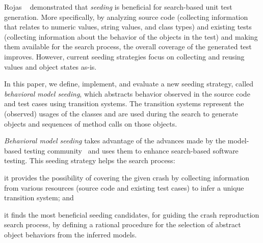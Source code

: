 
Rojas \etal~\cite{Rojas2016} demonstrated that \emph{seeding} is beneficial for search-based unit test generation. More specifically, by analyzing source code (collecting information that relates to numeric values, string values, and class types) and existing tests (collecting information about the behavior of the objects in the test) and making them available for the search process, the overall coverage of the generated test improves. 
However, current seeding strategies focus on collecting and reusing values and object states as-is. 

In this paper, we define, implement, and evaluate a new seeding strategy, called \emph{behavioral model seeding}, which abstracts behavior observed in the source code and test cases using transition systems. The transition systems represent the (observed) usages of the classes and are used during the search to generate objects and sequences of method calls on those objects.

\emph{Behavioral model seeding} takes advantage of the advances made by the model-based testing community~\cite{Utting2007} and uses them to enhance search-based software testing. This seeding strategy helps the search process: 
\begin{inparaenum}[(i)]
\item it provides the possibility of covering the given crash by collecting information from various resources (\eg source code and existing test cases)  to infer a unique transition system; and
\item it finds the most beneficial seeding candidates, for guiding the crash reproduction search process, by defining a rational procedure for the selection of abstract object behaviors from the inferred models.
\end{inparaenum} 

